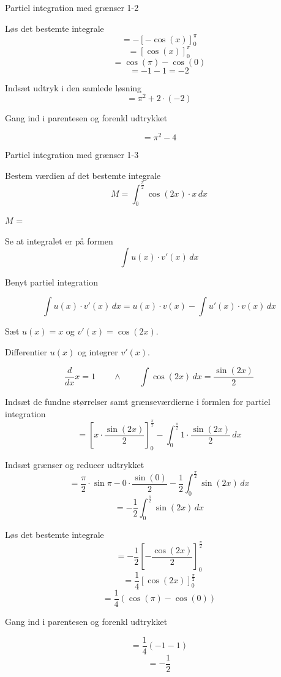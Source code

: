\documentclass{article}
\begin{document}
\begin{exercise}{Partiel integration med grænser 1-2}
	\hint 
	
	Løs det bestemte integrale
	\[
	= -\left[ -  \cos(x) \right]_0^\pi
	\]
	\[
	= \left[ \cos(x) \right]_0^\pi
	\]
	\[
	= \cos(\pi) - \cos(0)
	\]
	\[
	= -1 - 1 = -2
	\]

	
	
	\hint
	Indsæt udtryk i den samlede løsning
	\[
	= \pi^2 + 2 \cdot ( -2 )
	\]
	
	\hint
	Gang ind i parentesen og forenkl udtrykket
	
	\hint
	\[
	= \pi ^2 - 4
	\]
	
	
	
\end{exercise}

\newpage

\begin{exercise}{Partiel integration med grænser 1-3}
	
	Bestem værdien af det bestemte integrale
	\[
	M = \int_0^{\frac{\pi}{2}} \cos(2x) \cdot x \, dx
	\]
	
	$M$ =  
	
	
	\hint
	
	Se at integralet er på formen
	\[
	\int u(x) \cdot v'(x) \, dx
	\]
	
	\hint
	
	Benyt partiel integration
	
	\hint
	\[
	\int u(x) \cdot v'(x)\, dx = u(x) \cdot v(x) - \int u'(x) \cdot v(x) \, dx
	\]
	\hint
	
	Sæt $u(x) = x$ og $v'(x) = \cos(2x)$.
	
	
	\hint
	
	Differentier $u(x)$ og integrer $v'(x)$.
	
	\hint
	\[
	\frac{d}{dx}x = 1 \qquad \wedge \qquad \int \cos(2x) \, dx = \frac{\sin(2x)}{2}
	\]
	
	\hint
	
	Indsæt de fundne størrelser samt grænseværdierne i formlen for partiel integration 
	\[
	= \left[x \cdot \frac{\sin(2x)}{2}\right]_{0}^{\frac{\pi}{2}} - \int_{0}^{\frac{\pi}{2}} 1 \cdot \frac{\sin(2x)}{2} \, dx
	\]
	
	\hint
	
	Indsæt grænser og reducer udtrykket
	\[
	=  \frac{\pi}{2} \cdot \sin{\pi} - 0 \cdot \frac{\sin(0)}{2}  - \frac{1}{2} \int_{0}^{\frac{\pi}{2}} \sin(2x)  \, dx 
	\]
	\[
	 = - \frac{1}{2} \int_{0}^{\frac{\pi}{2}} \sin(2x)  \, dx
	\]
	
	\hint
	Løs det bestemte integrale
	\[
	= - \frac{1}{2} \left[ - \frac{\cos(2x)}{2}  \right]_{0}^{\frac{\pi}{2}} 
	\]
	\[
	= \frac{1}{4} \left[ \cos(2x) \right]_{0}^{\frac{\pi}{2}} 
	\]
	\[
	= \frac{1}{4} \left( \cos(\pi) - \cos(0) \right) 
	\]
	
	\hint
	Gang ind i parentesen og forenkl udtrykket
	
	\hint
	\[
	= \frac{1}{4} (-1 -1) 
	\]
	\[
	= - \frac{1}{2}
	\]
	
	
	
\end{exercise}
\end{document}
